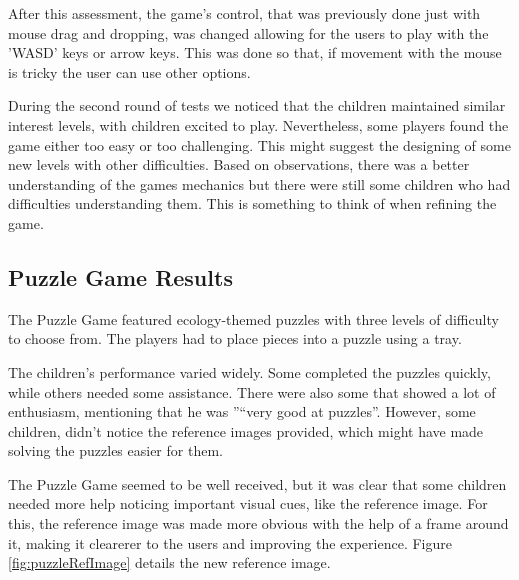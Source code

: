 After this assessment, the game's control, that was previously done just with mouse drag and dropping, was changed allowing for the users to play with the 'WASD' keys or arrow keys. This was done so that, if movement with the mouse is tricky the user can use other options.

During the second round of tests we noticed that the children maintained similar interest levels, with children excited to play. Nevertheless, some players found the game either too easy or too challenging. This might suggest the designing of some new levels with other difficulties. Based on observations, there was a better understanding of the games mechanics but there were still some children who had difficulties understanding them. This is something to think of when refining the game.


\newpage
\subsection{Puzzle Game Results}

The Puzzle Game featured ecology-themed puzzles with three levels of difficulty to choose from. The players had to place pieces into a puzzle using a tray.

The children’s performance varied widely. Some completed the puzzles quickly, while others needed some assistance. There were also some that showed a lot of enthusiasm, mentioning that he was ''“very good at puzzles''. However, some children, didn’t notice the reference images provided, which might have made solving the puzzles easier for them.

The Puzzle Game seemed to be well received, but it was clear that some children needed more help noticing important visual cues, like the reference image. For this, the reference image was made more obvious with the help of a frame around it, making it clearerer to the users and improving the experience. Figure \ref{fig:puzzleRefImage} details the new reference image.

